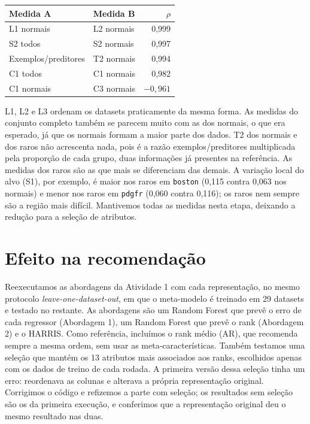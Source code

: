 \documentclass[10pt,a4paper]{article}
\begin{document}
\begin{center}
\small
\begin{tabular}{llr}
\toprule
Medida A & Medida B & $\rho$ \\
\midrule
L1 normais & L2 normais & 0,999 \\
S2 todos & S2 normais & 0,997 \\
Exemplos/preditores & T2 normais & 0,994 \\
C1 todos & C1 normais & 0,982 \\
C1 normais & C3 normais & $-0{,}961$ \\
\bottomrule
\end{tabular}
\end{center}

L1, L2 e L3 ordenam os datasets praticamente da mesma forma. As medidas do conjunto completo também se parecem muito com as dos normais, o que era esperado, já que os normais formam a maior parte dos dados. T2 dos normais e dos raros não acrescenta nada, pois é a razão exemplos/preditores multiplicada pela proporção de cada grupo, duas informações já presentes na referência. As medidas dos raros são as que mais se diferenciam das demais. A variação local do alvo (S1), por exemplo, é maior nos raros em \texttt{boston} (0,115 contra 0,063 nos normais) e menor nos raros em \texttt{pdgfr} (0,060 contra 0,116); os raros nem sempre são a região mais difícil. Mantivemos todas as medidas nesta etapa, deixando a redução para a seleção de atributos.

\section{Efeito na recomendação}
\label{sec:avaliacao}

Reexecutamos as abordagens da Atividade 1 com cada representação, no mesmo protocolo \emph{leave-one-dataset-out}, em que o meta-modelo é treinado em 29 datasets e testado no restante. As abordagens são um Random Forest que prevê o erro de cada regressor (Abordagem 1), um Random Forest que prevê o rank (Abordagem 2) e o HARRIS. Como referência, incluímos o rank médio (AR), que recomenda sempre a mesma ordem, sem usar as meta-características. Também testamos uma seleção que mantém os 13 atributos mais associados aos ranks, escolhidos apenas com os dados de treino de cada rodada. A primeira versão dessa seleção tinha um erro: reordenava as colunas e alterava a própria representação original. Corrigimos o código e refizemos a parte com seleção; os resultados sem seleção são os da primeira execução, e conferimos que a representação original deu o mesmo resultado nas duas.
\end{document}
